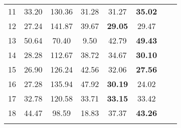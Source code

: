 \begin{table*}[!thp]
\begin{tabular}{c|c|cc|cc|cl}
        11 &33.20 &130.36 &31.28 &31.27 &\textbf{35.02} & & \\
        12 &27.24 &141.87 &39.67 &\textbf{29.05} &29.47 & & \\
        13 &50.64 &70.40  &9.50  &42.79 &\textbf{49.43} & & \\
        14 &28.28 &112.67 &38.72 &34.67 &\textbf{30.10} & & \\
        15 &26.90 &126.24 &42.56 &32.06 &\textbf{27.56} & & \\
        16 &27.28 &135.94 &47.92 &\textbf{30.19} &24.02 & & \\
        17 &32.78 &120.58 &33.71 &\textbf{33.15} &33.42 & & \\
        18 &44.47 &98.59  &18.83 &37.37 &\textbf{43.26} & & \\
        \shline
    \end{tabular}
\end{table*}

